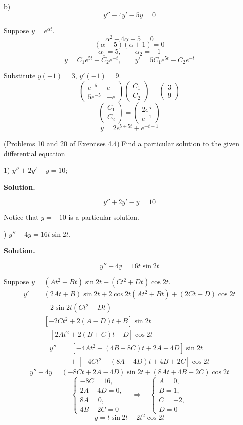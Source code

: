 \documentclass[11pt,a4paper]{article}
\begin{document}
\medskip
\noindent b)
\[
y''-4y'-5y=0
\]

Suppose \(y=e^{\alpha t}\).
\[
\alpha^2-4\alpha-5=0
\]
\[
(\alpha-5)(\alpha+1)=0
\]
\[
\alpha_1=5,\qquad \alpha_2=-1
\]
\[
y=C_1e^{5t}+C_2e^{-t},
\qquad
y'=5C_1e^{5t}-C_2e^{-t}
\]

Substitute \(y(-1)=3\), \(y'(-1)=9\).
\[
\begin{pmatrix}
e^{-5} & e\\
5e^{-5} & -e
\end{pmatrix}
\begin{pmatrix}
C_1\\
C_2
\end{pmatrix}
=
\begin{pmatrix}
3\\
9
\end{pmatrix}
\]
\[
\begin{pmatrix}
C_1\\
C_2
\end{pmatrix}
=
\begin{pmatrix}
2e^5\\
e^{-1}
\end{pmatrix}
\]
\[
y=2e^{5+5t}+e^{-t-1}
\]

\bigskip

 (Problems 10 and 20 of Exercises 4.4) Find a particular solution to the given
differential equation

1) $y'' + 2y' - y = 10$;
\medskip
\par\medskip
\noindent\textbf{Solution.}\par
\medskip
\[
y''+2y'-y=10
\]

Notice that \(y=-10\) is a particular solution.

) $y'' + 4y = 16t \sin 2t$.
\par\medskip
\noindent\textbf{Solution.}\par
\medskip
\[
y''+4y=16t\sin2t
\]

Suppose \(y=(At^2+Bt)\sin2t+(Ct^2+Dt)\cos2t\).
\[
\begin{aligned}
y'
&=(2At+B)\sin2t+2\cos2t(At^2+Bt)
 +(2Ct+D)\cos2t\\
&\quad-2\sin2t(Ct^2+Dt)\\
&=\left[-2Ct^2+2(A-D)t+B\right]\sin2t\\
&\quad+\left[2At^2+2(B+C)t+D\right]\cos2t
\end{aligned}
\]
\[
\begin{aligned}
y''
&=\left[-4At^2-(4B+8C)t+2A-4D\right]\sin2t\\
&\quad+\left[-4Ct^2+(8A-4D)t+4B+2C\right]\cos2t
\end{aligned}
\]
\[
y''+4y
=(-8Ct+2A-4D)\sin2t+(8At+4B+2C)\cos2t
\]
\[
\begin{cases}
-8C=16,\\
2A-4D=0,\\
8A=0,\\
4B+2C=0
\end{cases}
\quad\Longrightarrow\quad
\begin{cases}
A=0,\\
B=1,\\
C=-2,\\
D=0
\end{cases}
\]
\[
y=t\sin2t-2t^2\cos2t
\]

\bigskip
\end{document}
